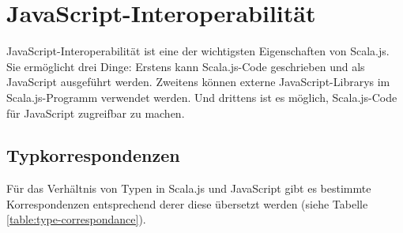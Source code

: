 \documentclass[a4paper, 12pt, hidelinks, listof=totoc, listoftables=totoc, bibliography=totoc]{scrreprt}
\begin{document}
	


\section{JavaScript-Interoperabilität}

JavaScript-Interoperabilität ist eine der wichtigsten Eigenschaften von Scala.js. Sie ermöglicht drei Dinge: Erstens kann Scala.js-Code geschrieben und als JavaScript ausgeführt werden. Zweitens können externe JavaScript-Librarys im Scala.js-Programm verwendet werden. Und drittens ist es möglich, Scala.js-Code für JavaScript zugreifbar zu machen.

\subsection{Typkorrespondenzen}

Für das Verhältnis von Typen in Scala.js und JavaScript gibt es bestimmte Korrespondenzen entsprechend derer diese übersetzt werden (siehe Tabelle \ref{table:type-correspondance}).

\medskip
\end{document}

